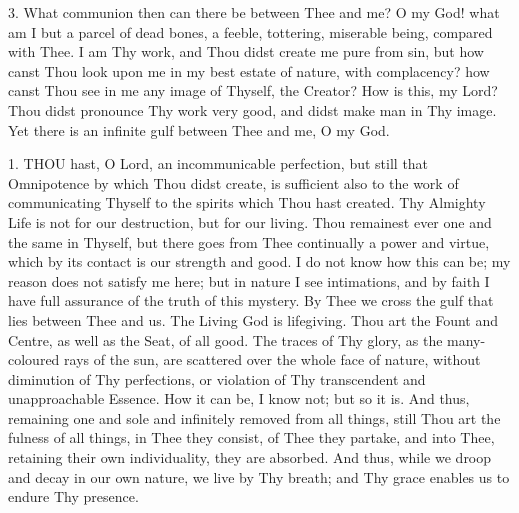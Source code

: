3. What communion then can there
be between Thee and me? O my God! what am I but a parcel of dead bones,
a feeble, tottering, miserable being, compared with Thee. I am Thy work,
and Thou didst create me pure from sin, but how canst Thou look upon me
in my best estate of nature, with complacency? how canst Thou see in me
any image of Thyself, the Creator? How is this, my Lord? Thou didst
pronounce Thy work very good, and didst make man in Thy image. Yet there
is an infinite gulf between Thee and me, O my God.


1. THOU
hast, O Lord, an incommunicable perfection, but still that Omnipotence
by which Thou didst create, is sufficient also to the work of
communicating Thyself to the spirits which Thou hast created. Thy
Almighty Life is not for our destruction, but for our living. Thou
remainest ever one and the same in Thyself, but there goes from Thee
continually a power and virtue, which by its contact is our strength and
good. I do not know how this can be; my reason does not satisfy me here;
but in nature I see intimations, and by faith I have full assurance of
the truth of this mystery. By Thee we cross the gulf that lies between
Thee and us. The Living God is lifegiving. Thou art the Fount and
Centre, as well as the Seat, of all good. The traces of Thy glory, as
the many-coloured rays of the sun, are scattered over the whole face of
nature, without diminution of Thy perfections, or violation of Thy
transcendent and unapproachable Essence. How it can be, I know not; but
so it is. And thus, remaining one and sole and infinitely removed from
all things, still Thou art the fulness of all things, in Thee they
consist, of Thee they partake, and into Thee, retaining their own
individuality, they are absorbed. And thus, while we droop and
decay in our own nature, we live by Thy breath; and Thy grace enables us
to endure Thy presence.

